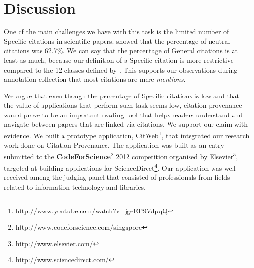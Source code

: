 \chapter{Discussion}
\label{discussion}
One of the main challenges we have with this task is the limited number of Specific citations in scientific papers.  showed that the percentage of neutral citations was 62.7\%. We can say that the percentage of General citations is at least as much, because our definition of a Specific citation is more restrictive compared to the 12 classes defined by . This supports our observations during annotation collection that most citations are mere \textit{mentions}.

We argue that even though the percentage of Specific citations is low and that the value of applications that perform such task seems low, citation provenance would prove to be an important reading tool that helps readers understand and navigate between papers that are linked via citations. We support our claim with evidence. We built a prototype application, CitWeb\footnote{\url{http://www.youtube.com/watch?v=jgeEP9VdpqQ}}, that integrated our research work done on Citation Provenance. The application was built as an entry submitted to the \textbf{CodeForScience}\footnote{\url{http://www.codeforscience.com/singapore}} 2012 competition organised by Elsevier\footnote{\url{http://www.elsevier.com/}}, targeted at building applications for ScienceDirect\footnote{\url{http://www.sciencedirect.com/}}. Our application was well received among the judging panel that consisted of professionals from fields related to information technology and libraries.

%
